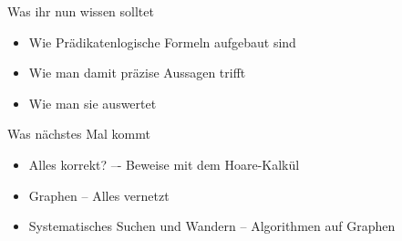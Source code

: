 \begin{frame}	
	\begin{block}{Was ihr nun wissen solltet}
		\begin{itemize}
			\item Wie Prädikatenlogische Formeln aufgebaut sind
			\item Wie man damit präzise Aussagen trifft
			\item Wie man sie auswertet
		\end{itemize}
	\end{block}
	
	\begin{block}{Was nächstes Mal kommt}
		\begin{itemize}
			\item Alles korrekt? –- Beweise mit dem Hoare-Kalkül
			\item Graphen -- Alles vernetzt
			\item Systematisches Suchen und Wandern -- Algorithmen auf Graphen
		\end{itemize}
	\end{block}
\end{frame}

\slideThanks

